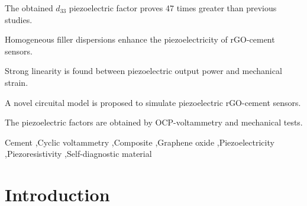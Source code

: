 \documentclass[a4paper,fleqn]{cas-sc}
\begin{document}
\begin{highlights}  %
\item The obtained $d_{33}$ piezoelectric factor proves 47 times greater than previous studies.
\item Homogeneous filler dispersions enhance the piezoelectricity of rGO-cement sensors.
\item Strong linearity is found between piezoelectric output power and mechanical strain.
\item A novel circuital model is proposed to simulate piezoelectric rGO-cement sensors. 
\item The piezoelectric factors are obtained by OCP-voltammetry and mechanical tests.
\end{highlights}


\begin{keywords}
Cement \sep Cyclic voltammetry \sep  Composite \sep Graphene oxide \sep Piezoelectricity \sep Piezoresistivity \sep Self-diagnostic material 
\end{keywords}

\maketitle


\section{Introduction}\label{Sect0}
\end{document}
